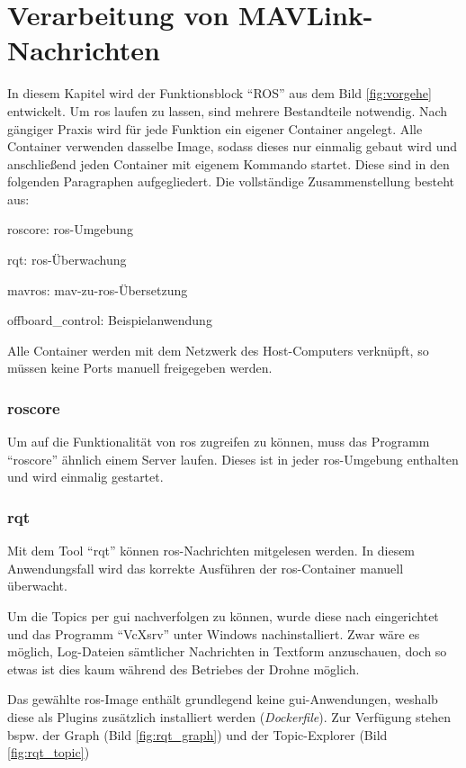 \section{Verarbeitung von MAVLink-Nachrichten}
In diesem Kapitel wird der Funktionsblock \enquote{ROS} aus dem Bild \ref{fig:vorgehe} entwickelt. Um \acrshort{ros} laufen zu lassen, sind mehrere Bestandteile notwendig. Nach gängiger Praxis wird für jede Funktion ein eigener Container angelegt. Alle Container verwenden dasselbe Image, sodass dieses nur einmalig gebaut wird und anschließend jeden Container mit eigenem Kommando startet. Diese sind in den folgenden Paragraphen aufgegliedert. Die vollständige Zusammenstellung besteht aus:
\begin{compactitem}
    \item roscore: \acrshort{ros}-Umgebung
    \item rqt: \acrshort{ros}-Überwachung
    \item mavros: \gls{mav}-zu-\acrshort{ros}-Übersetzung
    \item offboard\_control: Beispielanwendung
\end{compactitem}

Alle Container werden mit dem Netzwerk des Host-Computers verknüpft, so müssen keine Ports manuell freigegeben werden.

\subsubsection{roscore}
Um auf die Funktionalität von \acrshort{ros} zugreifen zu können, muss das Programm \enquote{roscore} ähnlich einem Server laufen. Dieses ist in jeder \acrshort{ros}-Umgebung enthalten und wird einmalig gestartet.

\subsubsection{rqt}
Mit dem Tool \enquote{rqt} können \acrshort{ros}-Nachrichten mitgelesen werden. In diesem Anwendungsfall wird das korrekte Ausführen der \acrshort{ros}-Container manuell überwacht.

Um die Topics per \gls{gui} nachverfolgen zu können, wurde diese nach \cite{fishRunningROSGUI} eingerichtet und das Programm \enquote{VcXsrv} unter Windows nachinstalliert. Zwar wäre es möglich, Log-Dateien sämtlicher Nachrichten in Textform anzuschauen, doch so etwas ist dies kaum während des Betriebes der Drohne möglich.

Das gewählte \acrshort{ros}-Image enthält grundlegend keine \gls{gui}-Anwendungen, weshalb diese als Plugins zusätzlich installiert werden (\textit{Dockerfile}). Zur Verfügung stehen bspw. der Graph (Bild \ref{fig:rqt_graph}) und der Topic-Explorer (Bild \ref{fig:rqt_topic})

